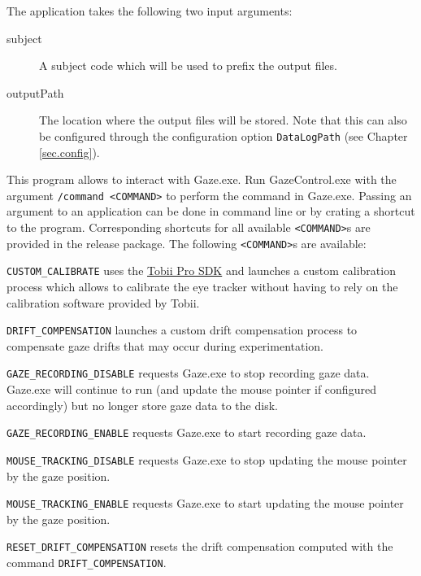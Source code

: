 \documentclass[a4paper,oneside]{book}
\begin{document}
\begin{description}
        The application takes the following two input arguments:
        \begin{description}
            \item[subject]
                A subject code which will be used to prefix the output files.
            \item[outputPath]
                The location where the output files will be stored.
                Note that this can also be configured through the configuration option \texttt{DataLogPath} (see Chapter \ref{sec.config}).
        \end{description}
    \item[GazeControl.exe] This program allows to interact with Gaze.exe.
        Run GazeControl.exe with the argument \texttt{/command <COMMAND>} to perform the command in Gaze.exe.
        Passing an argument to an application can be done in command line or by crating a shortcut to the program.
        Corresponding shortcuts for all available \texttt{<COMMAND>}s are provided in the release package.
        The following \texttt{<COMMAND>}s are available:
        \begin{description}
            \item{\texttt{CUSTOM\_CALIBRATE}} uses the \href{http://developer.tobii.com/tobii-pro-sdk/}{Tobii Pro SDK} and launches a custom calibration process which allows to calibrate the eye tracker without having to rely on the calibration software provided by Tobii.
            \item{\texttt{DRIFT\_COMPENSATION}} launches a custom drift compensation process to compensate gaze drifts that may occur during experimentation.
            \item{\texttt{GAZE\_RECORDING\_DISABLE}} requests Gaze.exe to stop recording gaze data.
                Gaze.exe will continue to run (and update the mouse pointer if configured accordingly) but no longer store gaze data to the disk.
            \item{\texttt{GAZE\_RECORDING\_ENABLE}} requests Gaze.exe to start recording gaze data.
            \item{\texttt{MOUSE\_TRACKING\_DISABLE}} requests Gaze.exe to stop updating the mouse pointer by the gaze position.
            \item{\texttt{MOUSE\_TRACKING\_ENABLE}} requests Gaze.exe to start updating the mouse pointer by the gaze position.
            \item{\texttt{RESET\_DRIFT\_COMPENSATION}} resets the drift compensation computed with the command \texttt{DRIFT\_COMPENSATION}.

\end{description}
\end{description}
\end{document}
